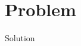 \documentclass[11pt]{article}
\begin{document}
\section{Problem}
Solution
\clearpage
\end{document}

